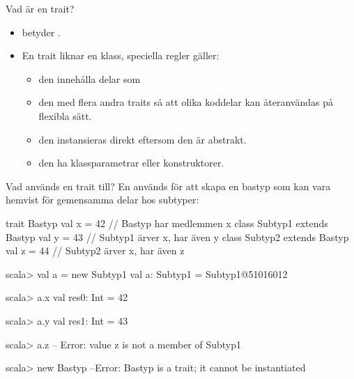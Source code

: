 \begin{Slide}{Vad är en trait?}
\begin{itemize}
\item {} betyder .

\item En trait liknar en klass,  speciella regler gäller:

\begin{itemize}

\item den  innehålla delar som 

\item den  med flera andra traits så att olika koddelar kan återanvändas på flexibla sätt.

\item den  instansieras direkt eftersom den är abstrakt.

\item den  ha klassparametrar eller konstruktorer.
\end{itemize}
\end{itemize}

\end{Slide}

\begin{Slide}{Vad används en trait till?}
En  används för att skapa en bastyp som kan vara hemvist för gemensamma delar hos subtyper:
\begin{Code}
trait Bastyp { val x = 42 }                 // Bastyp har medlemmen x
class Subtyp1 extends Bastyp { val y = 43 } // Subtyp1 ärver x, har även y
class Subtyp2 extends Bastyp { val z = 44 } // Subtyp2 ärver x, har även z
\end{Code}
\pause\vspace{-0.5em}
\begin{REPLsmall}
scala> val a = new Subtyp1
val a: Subtyp1 = Subtyp1@51016012

scala> a.x
val res0: Int = 42

scala> a.y
val res1: Int = 43

scala> a.z
-- Error:
  value z is not a member of Subtyp1

scala> new Bastyp
--Error:
  Bastyp is a trait; it cannot be instantiated
\end{REPLsmall}

\end{Slide}



